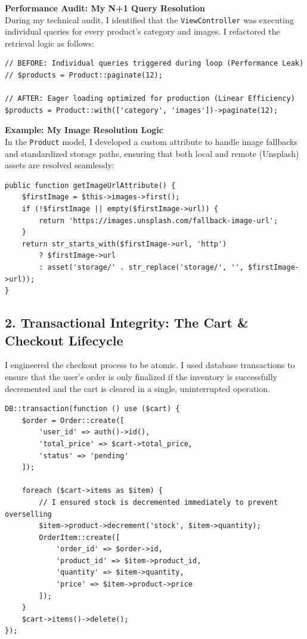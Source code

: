 \documentclass[12pt,a4paper]{article}
\begin{document}
\textbf{Performance Audit: My N+1 Query Resolution} \\
During my technical audit, I identified that the \texttt{ViewController} was executing individual queries for every product's category and images. I refactored the retrieval logic as follows:
\begin{lstlisting}
// BEFORE: Individual queries triggered during loop (Performance Leak)
// $products = Product::paginate(12);

// AFTER: Eager loading optimized for production (Linear Efficiency)
$products = Product::with(['category', 'images'])->paginate(12);
\end{lstlisting}

\textbf{Example: My Image Resolution Logic} \\
In the \texttt{Product} model, I developed a custom attribute to handle image fallbacks and standardized storage paths, ensuring that both local and remote (Unsplash) assets are resolved seamlessly:
\begin{lstlisting}
public function getImageUrlAttribute() {
    $firstImage = $this->images->first();
    if (!$firstImage || empty($firstImage->url)) {
        return 'https://images.unsplash.com/fallback-image-url';
    }
    return str_starts_with($firstImage->url, 'http') 
        ? $firstImage->url 
        : asset('storage/' . str_replace('storage/', '', $firstImage->url));
}
\end{lstlisting}

\subsection{2. Transactional Integrity: The Cart \& Checkout Lifecycle}
I engineered the checkout process to be atomic. I used database transactions to ensure that the user’s order is only finalized if the inventory is successfully decremented and the cart is cleared in a single, uninterrupted operation.

\begin{lstlisting}
DB::transaction(function () use ($cart) {
    $order = Order::create([
        'user_id' => auth()->id(),
        'total_price' => $cart->total_price,
        'status' => 'pending'
    ]);

    foreach ($cart->items as $item) {
        // I ensured stock is decremented immediately to prevent overselling
        $item->product->decrement('stock', $item->quantity);
        OrderItem::create([
            'order_id' => $order->id,
            'product_id' => $item->product_id,
            'quantity' => $item->quantity,
            'price' => $item->product->price
        ]);
    }
    $cart->items()->delete();
});
\end{lstlisting}
\end{document}
